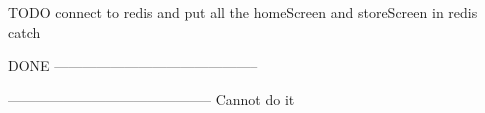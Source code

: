 TODO connect to redis and put all the homeScreen and storeScreen
        in redis catch


DONE
--------------------------------------------



--------------------------------------------
Cannot do it